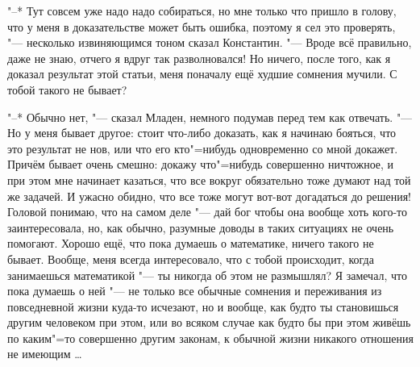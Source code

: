 "--* Тут совсем уже надо надо собираться, но мне только что пришло в голову, что
у меня в доказательстве может быть ошибка, поэтому я сел это проверять, "---
несколько извиняющимся тоном сказал Константин.
"--- Вроде всё правильно, даже не знаю, отчего я вдруг так разволновался!
Но ничего, после того, как я доказал результат этой статьи, меня поначалу ещё
худшие сомнения мучили.
С тобой такого не бывает?

"--* Обычно нет, "--- сказал Младен, немного подумав перед тем как отвечать.
"--- Но у меня бывает другое: стоит что-либо доказать, как я начинаю бояться,
что это результат не нов, или что его кто"=нибудь одновременно со мной докажет.
Причём бывает очень смешно: докажу что"=нибудь совершенно ничтожное, и при этом
мне начинает казаться, что все вокруг обязательно тоже думают над той же задачей.
И ужасно обидно, что все тоже могут вот-вот догадаться до решения!
Головой понимаю, что на самом деле "--- дай бог чтобы она вообще хоть кого-то
заинтересовала, но, как обычно, разумные доводы в таких ситуациях не очень
помогают.
Хорошо ещё, что пока думаешь о математике, ничего такого не бывает.
Вообще, меня всегда интересовало, что с тобой происходит, когда занимаешься
математикой "--- ты никогда об этом не размышлял?
Я замечал, что пока думаешь о ней "--- не только все обычные сомнения и
переживания из повседневной жизни куда-то исчезают, но и вообще, как будто ты
становишься другим человеком при этом, или во всяком случае как будто бы при
этом живёшь по каким"=то совершенно другим законам, к обычной жизни никакого
отношения не имеющим \ldots

